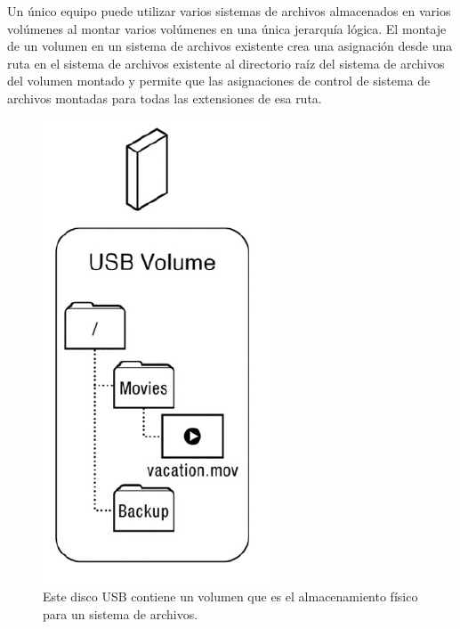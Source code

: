 \documentclass[10pt]{book}
\begin{document}
Un único equipo puede utilizar varios sistemas de archivos almacenados en varios volúmenes al montar varios volúmenes en una única jerarquía lógica. El montaje de un volumen en un sistema de archivos existente crea una asignación desde una ruta en el sistema de archivos existente al directorio raíz del sistema de archivos del volumen montado y permite que las asignaciones de control de sistema de archivos montadas para todas las extensiones de esa ruta.

\begin{figure}[tbhp]
\centerline{\includegraphics[scale=0.70]{img/fig1101}}
\caption{Este disco USB contiene un volumen que es el almacenamiento físico para un sistema de archivos.}
\label{fig1101}
\end{figure}
\end{document}
